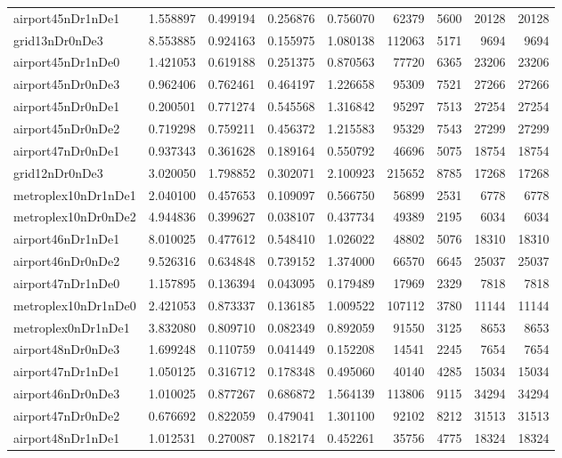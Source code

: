 \documentclass[../../../thesis.tex]{subfiles}
\begin{document}
\begin{longtable}{|l|r|r|r|r|r|r|r|r|}
airport45nDr1nDe1 & 1.558897 & 0.499194 & 0.256876 & 0.756070 & 62379 & 5600 & 20128 & 20128 \\
grid13nDr0nDe3 & 8.553885 & 0.924163 & 0.155975 & 1.080138 & 112063 & 5171 & 9694 & 9694 \\
airport45nDr1nDe0 & 1.421053 & 0.619188 & 0.251375 & 0.870563 & 77720 & 6365 & 23206 & 23206 \\
airport45nDr0nDe3 & 0.962406 & 0.762461 & 0.464197 & 1.226658 & 95309 & 7521 & 27266 & 27266 \\
airport45nDr0nDe1 & 0.200501 & 0.771274 & 0.545568 & 1.316842 & 95297 & 7513 & 27254 & 27254 \\
airport45nDr0nDe2 & 0.719298 & 0.759211 & 0.456372 & 1.215583 & 95329 & 7543 & 27299 & 27299 \\
airport47nDr0nDe1 & 0.937343 & 0.361628 & 0.189164 & 0.550792 & 46696 & 5075 & 18754 & 18754 \\
grid12nDr0nDe3 & 3.020050 & 1.798852 & 0.302071 & 2.100923 & 215652 & 8785 & 17268 & 17268 \\
metroplex10nDr1nDe1 & 2.040100 & 0.457653 & 0.109097 & 0.566750 & 56899 & 2531 & 6778 & 6778 \\
metroplex10nDr0nDe2 & 4.944836 & 0.399627 & 0.038107 & 0.437734 & 49389 & 2195 & 6034 & 6034 \\
airport46nDr1nDe1 & 8.010025 & 0.477612 & 0.548410 & 1.026022 & 48802 & 5076 & 18310 & 18310 \\
airport46nDr0nDe2 & 9.526316 & 0.634848 & 0.739152 & 1.374000 & 66570 & 6645 & 25037 & 25037 \\
airport47nDr1nDe0 & 1.157895 & 0.136394 & 0.043095 & 0.179489 & 17969 & 2329 & 7818 & 7818 \\
metroplex10nDr1nDe0 & 2.421053 & 0.873337 & 0.136185 & 1.009522 & 107112 & 3780 & 11144 & 11144 \\
metroplex0nDr1nDe1 & 3.832080 & 0.809710 & 0.082349 & 0.892059 & 91550 & 3125 & 8653 & 8653 \\
airport48nDr0nDe3 & 1.699248 & 0.110759 & 0.041449 & 0.152208 & 14541 & 2245 & 7654 & 7654 \\
airport47nDr1nDe1 & 1.050125 & 0.316712 & 0.178348 & 0.495060 & 40140 & 4285 & 15034 & 15034 \\
airport46nDr0nDe3 & 1.010025 & 0.877267 & 0.686872 & 1.564139 & 113806 & 9115 & 34294 & 34294 \\
airport47nDr0nDe2 & 0.676692 & 0.822059 & 0.479041 & 1.301100 & 92102 & 8212 & 31513 & 31513 \\
airport48nDr1nDe1 & 1.012531 & 0.270087 & 0.182174 & 0.452261 & 35756 & 4775 & 18324 & 18324 \\

\end{longtable}
\end{document}
